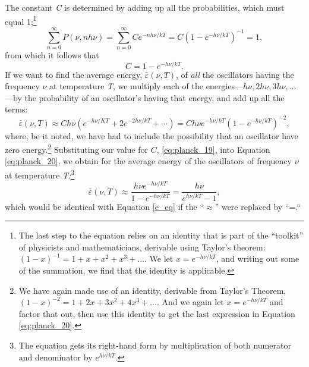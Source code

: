 The constant \emph{C} is determined by adding up all the probabilities, 
which must equal 1;\footnote{The last step to the equation relies on an
  identity that is part of the ``toolkit'' of physicists and
  mathematicians, derivable using Taylor's theorem: $(1-x)^{-1}=1+x+x^2+x^3+\dots.$ 
  We let $x = e^{-h\nu/kT}$, and writing out
  some of the summation, we find that the identity is applicable.}
%
\begin{equation}
\sum_{n=0}^{\infty} P(\nu, nh\nu) = \sum_{n=0}^{\infty} Ce^{-nh\nu/kT} = C(1 - e^{-h\nu/kT})^{-1} = 1, %
\end{equation}
%
from which it follows that
\begin{equation}\label{eq:planck_19}
C = 1 - e^{-h\nu/kT}. %
\end{equation}
If we want to find the average energy, $\bar{\varepsilon}(\nu, T)$, of \emph{all} the
oscillators having the frequency $\nu$ at temperature \emph{T}, we
multiply each of the energies---$h\nu, 2h\nu, 3h\nu, \dots$---by the 
probability of an oscillator's having that energy, and add up
all the terms:
%
\begin{equation}\label{eq:planck_20}
\bar{\varepsilon}(\nu, T) \approx Ch\nu\left(e^{-h\nu/KT}+2e^{-2h\nu/kT}+\cdots\right) = Ch\nu e^{-h\nu/kT}\left(1-e^{-h\nu/kT}\right)^{-2}, %
\end{equation}
%
where, be it noted, we have had to include the possibility that an
oscillator have zero energy.\footnote{We have again made use of an
  identity, derivable from Taylor's Theorem, 
  $(1 - x)^{-2} = 1 + 2x + 3x^2 + 4x^3 + \dots.$
  And we again let $x = e^{-h\nu/kT}$ and
  factor that out, then use this identity to get the last expression in
  Equation \eqref{eq:planck_20}.} 
Substituting our value for $C$, \eqref{eq:planck_19}, into Equation
\eqref{eq:planck_20}, we obtain for the average energy of the oscillators of frequency
$\nu$ at temperature \emph{T:}\footnote{The equation gets its
  right-hand form by multiplication of both numerator and denominator by
  $e^{h\nu/kT}$.}
%
\begin{equation}\label{eq:planck_21}
\bar{\varepsilon}(\nu, T) \approx \frac{h\nu e^{-h\nu/kT}}{1-e^{-h\nu/kT}} = \frac{h\nu}{e^{h\nu/kT}-1}, %
\end{equation}
%
which would be identical with Equation \eqref{e_eq} if the ``$\approx$'' were replaced
by ``=.``

